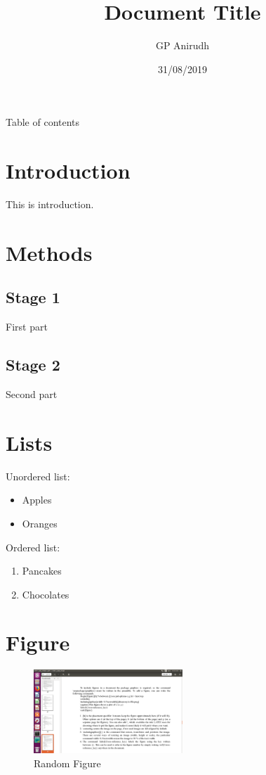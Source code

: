 \documentclass[a4paper,12pt]{article}
\begin{document}
\title{Document Title}
\author{GP Anirudh}
\date{31/08/2019}
\maketitle

\newpage
{}
Table of contents
\newpage
{}

\section{Introduction}
This is introduction.

\section{Methods}
\subsection{Stage 1}
\label{subsec1}
First part
\subsection{Stage 2}
\label{subsec2}
Second part

\section{Lists}
Unordered list:
\begin{itemize}
\item Apples
\item Oranges
\end{itemize}
Ordered list:
\begin{enumerate}
\item Pancakes
\item Chocolates
\end{enumerate}

\section{Figure}
\begin{figure}[h]
\centering
\includegraphics[width=0.5\textwidth]{figure.png}
\caption{Random Figure}
\label{crossref_key}
\end{figure}
\end{document}
